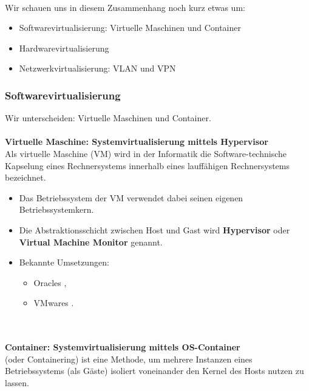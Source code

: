 ~\\
Wir schauen uns in diesem Zusammenhang noch kurz etwas um:
\begin{itemize}
	\item Softwarevirtualisierung: Virtuelle Maschinen und Container
	\item Hardwarevirtualisierung
	\item Netzwerkvirtualisierung: VLAN und VPN
\end{itemize}






\subsubsection{Softwarevirtualisierung}
Wir unterscheiden: Virtuelle Maschinen und Container.\\
~\\
\textbf{Virtuelle Maschine: Systemvirtualisierung mittels Hypervisor}\\
Als virtuelle Maschine (VM) wird in der Informatik die Software-technische Kapselung eines Rechnersystems innerhalb eines lauffähigen Rechnersystems bezeichnet.
\begin{itemize}
	\item Das Betriebssystem der VM verwendet dabei seinen eigenen Betriebssystemkern.
	\item Die Abstraktionsschicht zwischen Host und Gast wird \textbf{Hypervisor} oder \textbf{Virtual Machine Monitor} genannt.
	\item Bekannte Umsetzungen:
	\begin{itemize}
		\item Oracles ,
		\item VMwares .
	\end{itemize}
\end{itemize}
~\\~\\
\textbf{Container: Systemvirtualisierung mittels OS-Container}\\
 (oder Containering) ist eine Methode, um mehrere Instanzen eines Betriebssystems (als Gäste) isoliert voneinander den Kernel des Hosts nutzen zu lassen.

